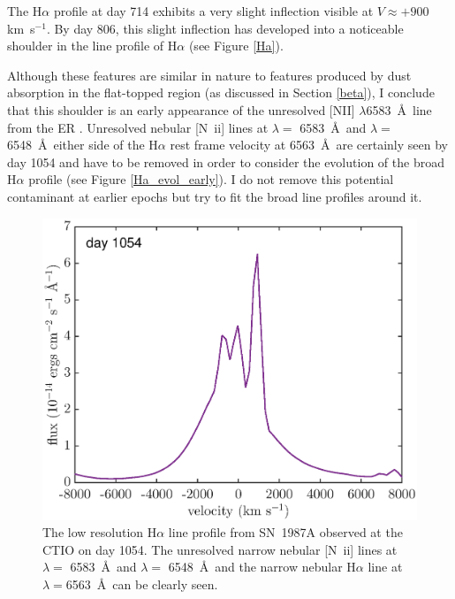 The H$\alpha$ profile at day 714 exhibits a very slight inflection visible 
at $V \approx +900$ km~s$^{-1}$.  By day 806, this slight inflection has 
developed into a noticeable shoulder in the line profile of H$\alpha$ (see 
Figure \ref{Ha}).




Although these features are similar in nature to features produced by dust 
absorption in the flat-topped region (as discussed in Section \ref{beta}), 
I conclude that this shoulder is an early appearance of the unresolved 
[NII] $\lambda$6583~\AA\ line from the ER \citep{Kozma1998b}.  Unresolved nebular [N~{\sc ii}] lines at $\lambda=$ 6583~\AA\ and 
$\lambda=$ 6548~\AA\ either side of the H$\alpha$ rest frame velocity at 
6563~\AA\ are certainly seen by day 1054 
and have to be removed in order to consider the evolution of the broad 
H$\alpha$ profile (see Figure \ref{Ha_evol_early}). I do not remove this 
potential contaminant at earlier epochs but try to fit the broad line 
profiles around it.

 

\begin{figure}
\centering
\includegraphics[clip=true,scale=0.6,trim= 0 0 0 0]{chapters/chapter5/images/d1054Ha}
\caption{The low resolution H$\alpha$ line profile from SN~1987A observed at the CTIO on day 1054.  The unresolved narrow nebular [N~{\sc ii}] lines at $\lambda=$ 6583~\AA\ and $\lambda=$ 6548~\AA\ and the narrow nebular H$\alpha$ line at $\lambda=$6563~\AA\  can be clearly seen.}
\label{d1054_Ha}
\end{figure}
 
